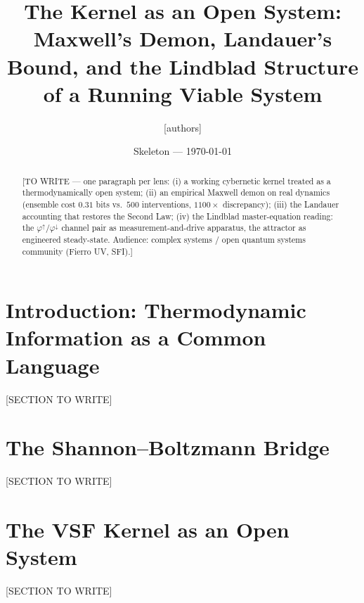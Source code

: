 \documentclass[12pt]{article}
\title{The Kernel as an Open System:\\
\large Maxwell's Demon, Landauer's Bound, and the Lindblad Structure of a Running Viable System}
\author{[authors]}
\date{Skeleton — \today}
\begin{document}
\maketitle

\begin{abstract}
[TO WRITE — one paragraph per lens: (i) a working cybernetic kernel treated as a
thermodynamically open system; (ii) an empirical Maxwell demon on real dynamics
(ensemble cost $0.31$ bits vs.\ $500$ interventions, $1100\times$ discrepancy);
(iii) the Landauer accounting that restores the Second Law; (iv) the Lindblad
master-equation reading: the $\varphi^{\uparrow}/\varphi^{\downarrow}$ channel
pair as measurement-and-drive apparatus, the attractor as engineered
steady-state. Audience: complex systems / open quantum systems community
(Fierro UV, SFI).]
\end{abstract}

\section{Introduction: Thermodynamic Information as a Common Language}
\label{sec:intro}
[SECTION TO WRITE]

\section{The Shannon--Boltzmann Bridge}
\label{sec:bridge}
[SECTION TO WRITE]

\section{The VSF Kernel as an Open System}
\label{sec:kernel}
[SECTION TO WRITE]
\end{document}
